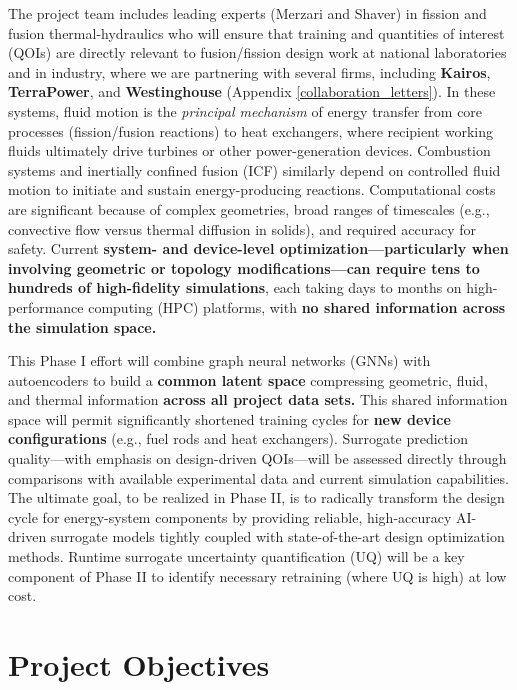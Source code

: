 The project team includes leading experts (Merzari and Shaver) in fission and
fusion thermal-hydraulics who will ensure that training and quantities of
interest (QOIs) are directly relevant to fusion/fission design work at national
laboratories and in industry, where we are partnering with several firms,
including {\bf Kairos}, {\bf TerraPower}, and {\bf Westinghouse} 
             (Appendix \ref{collaboration_letters}).
In these systems, fluid motion is the {\em principal mechanism} of
energy transfer from core processes (fission/fusion reactions) to heat exchangers, where
recipient working fluids ultimately drive turbines or other power-generation
devices.
%
Combustion systems and inertially confined fusion (ICF) similarly depend on
controlled fluid motion to initiate and sustain energy-producing reactions.
Computational costs are significant because of complex geometries, broad ranges
of timescales (e.g., convective flow versus thermal diffusion in solids), and
required accuracy for safety.
  Current {\bf system- and device-level optimization—particularly when involving
geometric or topology modifications—can require tens to hundreds of
high-fidelity simulations}, each taking days to months on high-performance
computing (HPC) platforms, with {\bf no shared information across the
simulation space.}   

  This Phase I effort will combine graph neural networks (GNNs) with
autoencoders to build a {\bf common latent space} compressing
geometric, fluid, and thermal information {\bf across all project data sets.}
This shared information space will permit significantly shortened training
cycles for {\bf new device configurations} (e.g., fuel rods and heat
exchangers).  Surrogate prediction quality---with emphasis on
design-driven QOIs---will be assessed directly through comparisons with
available experimental
data and current simulation capabilities.  The ultimate goal, to be realized in
Phase II, is to radically transform the design cycle for energy-system
components by providing reliable, high-accuracy AI-driven surrogate models
tightly coupled with state-of-the-art design optimization methods.  Runtime
surrogate uncertainty quantification (UQ) will be a key component of Phase II
to identify necessary retraining (where UQ is high) at low cost.

\section{Project Objectives}










